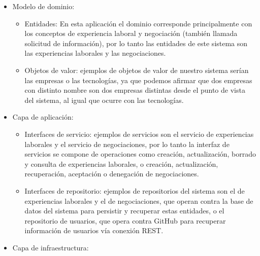 \documentclass[a4paper, 12pt]{book}
\begin{document}
    \begin{itemize}
        \item Modelo de dominio:

        \begin{itemize}
            \item Entidades: En esta aplicación el dominio corresponde principalmente con los conceptos de experiencia laboral y negociación (también llamada solicitud de información), por lo tanto
            las entidades de este sistema son las experiencias laborales y las negociaciones.
            \item Objetos de valor: ejemplos de objetos de valor de nuestro sistema serían las empresas o las tecnologías, ya que podemos afirmar que dos empresas con distinto nombre son dos empresas distintas desde el punto de vista del sistema, al igual que ocurre con las tecnologías.
        \end{itemize}

        \item Capa de aplicación:

        \begin{itemize}
            \item Interfaces de servicio: ejemplos de servicios son el servicio de experiencias laborales y el servicio de negociaciones, por lo tanto la interfaz de servicios se compone de operaciones como creación, actualización, borrado y consulta de experiencias laborales,
            o creación, actualización, recuperación, aceptación o denegación de negociaciones.
            \item Interfaces de repositorio: ejemplos de repositorios del sistema son el de experiencias laborales y el de negociaciones, que operan contra la base de datos del sistema para persistir y recuperar estas entidades, o el repositorio de usuarios, que opera contra GitHub para recuperar información de usuarios vía conexión REST.
        \end{itemize}


        \item Capa de infraestructura:


\end{itemize}
\end{document}
